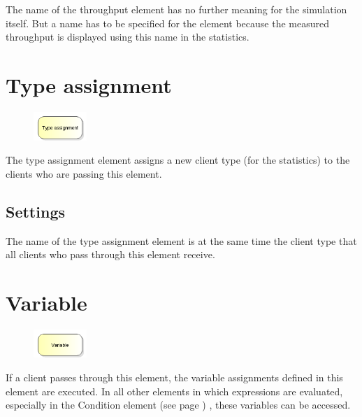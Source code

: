 The name of the throughput element has no further meaning for the simulation itself.
But a name has to be specified for the element because the measured throughput is
displayed using this name in the statistics.


\section{Type assignment}
\label{ref:ModelElementAssign}

\begin{figure}
\vspace{-22pt}
\includegraphics[width=2cm]{imageModelElementAssign.png}
\vspace{-22pt}
\end{figure}

The type assignment element assigns a new client type (for the statistics) to the clients who are passing this element.

\subsection*{Settings}

The name of the type assignment element is at the same time the client type that all clients who pass through this element receive.


\section{Variable}
\label{ref:ModelElementSet}

\begin{figure}
\vspace{-22pt}
\includegraphics[width=2cm]{imageModelElementSet.png}
\vspace{-22pt}
\end{figure}

If a client passes through this element, the variable assignments defined in
this element are executed. In all other elements in which expressions are evaluated,
especially in the Condition element (see page \pageref{ref:ModelElementHold}) , these variables can be accessed.

